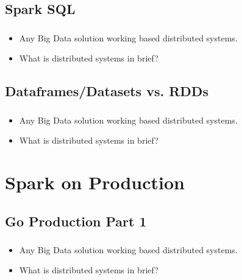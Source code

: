 
\subsection{Spark SQL}
\begin{frame}
  \frametitle{\subsecname}
	\begin{itemize}[<+->]
		\item Any Big Data solution working based distributed systems.
		\item What is distributed systems in brief?
	\end{itemize}
\end{frame}


\subsection{Dataframes/Datasets vs. RDDs}

\begin{frame}
  \frametitle{\subsecname}
	\begin{itemize}[<+->]
		\item Any Big Data solution working based distributed systems.
		\item What is distributed systems in brief?
	\end{itemize}
\end{frame}

\section{Spark on Production}

\subsection{Go Production Part 1}
\begin{frame}
  \frametitle{\subsecname}
	\begin{itemize}[<+->]
		\item Any Big Data solution working based distributed systems.
		\item What is distributed systems in brief?
	\end{itemize}
\end{frame}

